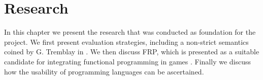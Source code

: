 \chapter{Research}
In this chapter we present the research that was conducted as foundation for the project. We first present evaluation strategies, including a non-strict semantics coined  by G. Tremblay in \cite{DBLP:journals/cl/Tremblay-lenient}. We then discuss \gls{FRP}, which is presented as a suitable candidate for integrating functional programming in games \cite{maraffi:frp,courtney2003yampa,cheong2005functional}. Finally we discuss how the usability of programming languages can be ascertained.



